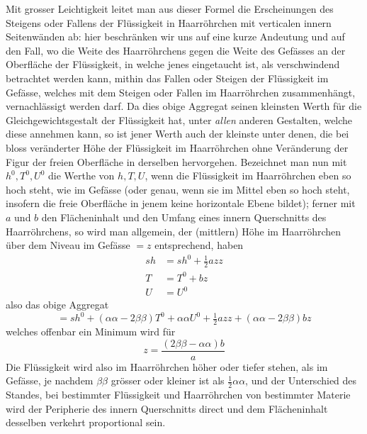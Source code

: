 Mit grosser Leichtigkeit leitet man aus dieser Formel die Erscheinungen des
Steigens oder Fallens der Flüssigkeit in Haarröhrchen mit verticalen innern
Seitenwänden ab: hier beschränken wir uns auf eine kurze Andeutung und auf den
Fall, wo die Weite des Haarröhrchens gegen die Weite des Gefässes an der Oberfläche
der Flüssigkeit, in welche jenes eingetaucht ist, als verschwindend betrachtet
werden kann, mithin das Fallen oder Steigen der Flüssigkeit im Gefässe, welches
mit dem Steigen oder Fallen im Haarröhrchen zusammenhängt,
\clearpage
{}
\noindent
vernachlässigt werden darf. Da dies obige Aggregat seinen kleinsten Werth für
die Gleichgewichtsgestalt der Flüssigkeit hat, unter \textit{allen} anderen Gestalten,
welche diese annehmen kann, so ist jener Werth auch der kleinste unter denen,
die bei bloss veränderter Höhe der Flüssigkeit im Haarröhrchen ohne Veränderung
der Figur der freien Oberfläche in derselben hervorgehen. Bezeichnet man nun
mit $h^0,T^0,U^0$ die Werthe von $h,T,U$, wenn die Flüssigkeit im Haarröhrchen
eben so hoch steht, wie im Gefässe (oder genau, wenn sie im Mittel eben so
hoch steht, insofern die freie Oberfläche in jenem keine horizontale Ebene
bildet); ferner mit $a$ und $b$ den Flächeninhalt und den Umfang eines innern
Querschnitts des Haarröhrchens, so wird man allgemein, der (mittlern) Höhe im
Haarröhrchen über dem Niveau im Gefässe $=z$ entsprechend, haben
\[
\begin{aligned}
sh&=sh^0+\tfrac12azz\\
T&=T^0+bz\\
U&=U^0
\end{aligned}
\]
also das obige Aggregat
\[
=sh^0+(\alpha\alpha-2\beta\beta)T^0+\alpha\alpha U^0
 +\tfrac12azz+(\alpha\alpha-2\beta\beta)bz
\]
welches offenbar ein Minimum wird für
\[
z=\frac{(2\beta\beta-\alpha\alpha)b}{a}
\]
Die Flüssigkeit wird also im Haarröhrchen höher oder tiefer stehen, als im
Gefässe, je nachdem $\beta\beta$ grösser oder kleiner ist als $\frac12\alpha\alpha$,
und der Unterschied des Standes, bei bestimmter Flüssigkeit und Haarröhrchen
von bestimmter Materie wird der Peripherie des innern Querschnitts direct und
dem Flächeninhalt desselben verkehrt proportional sein.

